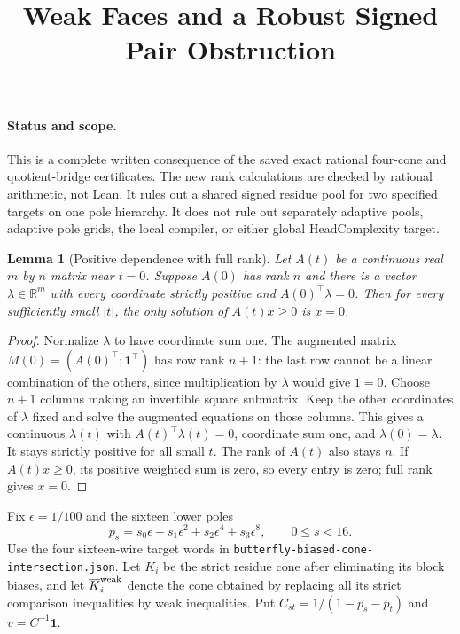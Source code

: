 \documentclass[11pt]{article}
\title{Weak Faces and a Robust Signed Pair Obstruction}
\author{}\date{}
\newtheorem{lemma}{Lemma}
\begin{document}
\maketitle
\paragraph{Status and scope.}
This is a complete written consequence of the saved exact rational
four-cone and quotient-bridge certificates. The new rank calculations
are checked by rational arithmetic, not Lean. It rules out a shared
signed residue pool for two specified targets on one pole hierarchy.
It does not rule out separately adaptive pools, adaptive pole grids,
the local compiler, or either global HeadComplexity target.

\begin{lemma}[Positive dependence with full rank]
Let $A(t)$ be a continuous real $m$ by $n$ matrix near $t=0$.
Suppose $A(0)$ has rank $n$ and there is a vector
$\lambda\in\mathbb R^m$ with every coordinate strictly positive and
$A(0)^\top\lambda=0$. Then for every sufficiently small $|t|$,
the only solution of $A(t)x\geq0$ is $x=0$.
\end{lemma}
\begin{proof}
Normalize $\lambda$ to have coordinate sum one. The augmented matrix
$M(0)=(A(0)^\top;\mathbf1^\top)$ has row rank $n+1$: the last row
cannot be a linear combination of the others, since multiplication by
$\lambda$ would give $1=0$. Choose $n+1$ columns making an invertible
square submatrix. Keep the other coordinates of $\lambda$ fixed and
solve the augmented equations on those columns. This gives a continuous
$\lambda(t)$ with $A(t)^\top\lambda(t)=0$, coordinate sum one, and
$\lambda(0)=\lambda$. It stays strictly positive for all small $t$.
The rank of $A(t)$ also stays $n$. If $A(t)x\geq0$, its positive
weighted sum is zero, so every entry is zero; full rank gives $x=0$.
\end{proof}

Fix $\epsilon=1/100$ and the sixteen lower poles
\[
 p_s=s_0\epsilon+s_1\epsilon^2+s_2\epsilon^4+s_3\epsilon^8,
 \qquad 0\leq s<16.
\]
Use the four sixteen-wire target words in
\texttt{butterfly-biased-cone-intersection.json}. Let $K_i$ be the
strict residue cone after eliminating its block biases, and let
$\overline K_i^{\rm weak}$ denote the cone obtained by replacing all
its strict comparison inequalities by weak inequalities.
Put $C_{st}=1/(1-p_s-p_t)$ and $v=C^{-1}\mathbf1$.
\end{document}
